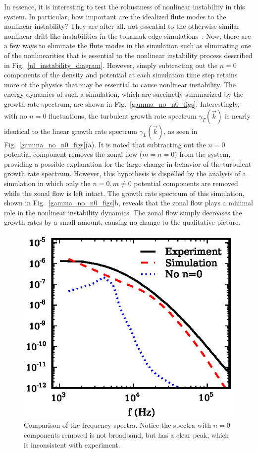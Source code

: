 \documentclass[showpacs,preprintnumbers,amsmath,amssymb,superscriptaddress,aip]{revtex4-1}
\begin{document}
In essence, it is interesting to test the robustness of nonlinear instability in this system. In particular, how important are the idealized flute modes to the nonlinear instability?
They are after all, not essential to the otherwise similar nonlinear drift-like instabilities in the tokamak edge simulations~\cite{zeiler1996,zeiler1997,scott2002,scott2003,scott2005}.
Now, there are a few ways to eliminate the flute modes in the simulation such as
eliminating one of the nonlinearities that is essential to the nonlinear instability process described in Fig.~\ref{nl_instability_diagram}. However, simply subtracting out the $n=0$
components of the density and potential at each simulation time step retains more of the physics that may be essential to cause nonlinear instability. The energy dynamics of such a simulation,
which are succinctly summarized by the growth rate spectrum,
are shown in Fig.~\ref{gamma_no_n0_figs}. Interestingly, with no $n=0$
fluctuations, the turbulent growth rate spectrum $\gamma_T(\vec{k})$ is nearly identical to the linear growth rate spectrum $\gamma_L(\vec{k})$, as seen in
Fig.~\ref{gamma_no_n0_figs}(a). It is noted that subtracting out the $n=0$ potential component removes the zonal flow ($m=n=0$) from the system, providing a possible explanation for the large change
in behavior of the turbulent growth rate spectrum. However, this hypothesis is dispelled by the analysis of a simulation in which only the $n=0, m \ne 0$ potential components are removed while 
the zonal flow is left intact. The growth rate spectrum of this simulation, shown in Fig.~\ref{gamma_no_n0_figs}b, reveals that the zonal flow plays a minimal role in the nonlinear instability
dynamics. The zonal flow simply decreases the growth rates by a small amount, causing no change to the qualitative picture. 

\begin{figure}[!htbp]
\includegraphics[]{spectra_3}
\hfil
\caption{Comparison of the frequency spectra. Notice the spectra with $n=0$ components removed is not broadband, but has a clear peak, which is inconsistent with experiment.}
\label{freq_spectra3}
\end{figure}
\end{document}
